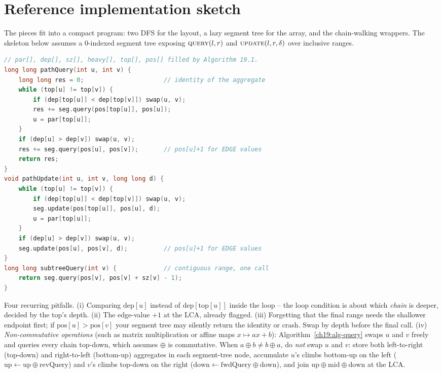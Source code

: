 \section{Reference implementation sketch}
\label{ch19:impl}

The pieces fit into a compact program: two DFS for the layout, a lazy segment tree for the array, and
the chain-walking wrappers. The skeleton below assumes a $0$-indexed segment tree exposing
$\textsc{query}(l,r)$ and $\textsc{update}(l,r,\delta)$ over inclusive ranges.

\begin{lstlisting}[language=C++]
// par[], dep[], sz[], heavy[], top[], pos[] filled by Algorithm 19.1.
long long pathQuery(int u, int v) {
    long long res = 0;                      // identity of the aggregate
    while (top[u] != top[v]) {
        if (dep[top[u]] < dep[top[v]]) swap(u, v);
        res += seg.query(pos[top[u]], pos[u]);
        u = par[top[u]];
    }
    if (dep[u] > dep[v]) swap(u, v);
    res += seg.query(pos[u], pos[v]);       // pos[u]+1 for EDGE values
    return res;
}
void pathUpdate(int u, int v, long long d) {
    while (top[u] != top[v]) {
        if (dep[top[u]] < dep[top[v]]) swap(u, v);
        seg.update(pos[top[u]], pos[u], d);
        u = par[top[u]];
    }
    if (dep[u] > dep[v]) swap(u, v);
    seg.update(pos[u], pos[v], d);          // pos[u]+1 for EDGE values
}
long long subtreeQuery(int v) {             // contiguous range, one call
    return seg.query(pos[v], pos[v] + sz[v] - 1);
}
\end{lstlisting}

\begin{trapbox}
Four recurring pitfalls. (i) Comparing $\mathrm{dep}[u]$ instead of $\mathrm{dep}[\mathrm{top}[u]]$
inside the loop -- the loop condition is about which \emph{chain} is deeper, decided by the top's
depth. (ii) The edge-value $+1$ at the LCA, already flagged. (iii) Forgetting that the final range
needs the shallower endpoint first; if $\mathrm{pos}[u]>\mathrm{pos}[v]$ your segment tree may silently
return the identity or crash. Swap by depth before the final call. (iv) \emph{Non-commutative operations}
(such as matrix multiplication or affine maps $x\mapsto ax+b$): Algorithm~\ref{ch19:alg-query} swaps $u$
and $v$ freely and queries every chain top-down, which assumes $\oplus$ is commutative. When
$a\oplus b\neq b\oplus a$, do \emph{not} swap $u$ and $v$: store both left-to-right (top-down) and
right-to-left (bottom-up) aggregates in each segment-tree node, accumulate $u$'s climbs bottom-up on the
left ($\mathrm{up}\gets \mathrm{up}\oplus \mathrm{revQuery}$) and $v$'s climbs top-down on the right
($\mathrm{down}\gets \mathrm{fwdQuery}\oplus \mathrm{down}$), and join $\mathrm{up}\oplus\mathrm{mid}\oplus\mathrm{down}$ at the LCA.
\end{trapbox}

